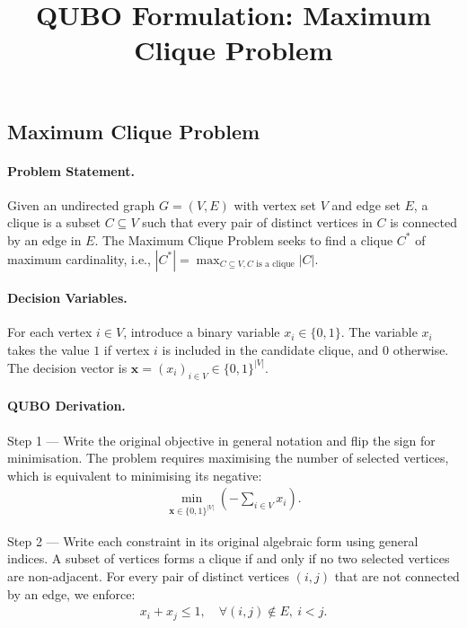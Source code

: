 \documentclass[12pt]{article}
\title{QUBO Formulation: Maximum Clique Problem}
\date{}
\begin{document}
\maketitle

\subsection*{Maximum Clique Problem}

\paragraph{Problem Statement.}
Given an undirected graph $G = (V, E)$ with vertex set $V$ and edge set $E$, a clique is a subset $C \subseteq V$ such that every pair of distinct vertices in $C$ is connected by an edge in $E$. The Maximum Clique Problem seeks to find a clique $C^*$ of maximum cardinality, i.e., $|C^*| = \max_{C \subseteq V, C \text{ is a clique}} |C|$.

\paragraph{Decision Variables.}
For each vertex $i \in V$, introduce a binary variable $x_i \in \{0, 1\}$. The variable $x_i$ takes the value $1$ if vertex $i$ is included in the candidate clique, and $0$ otherwise. The decision vector is $\mathbf{x} = (x_i)_{i \in V} \in \{0, 1\}^{|V|}$.

\paragraph{QUBO Derivation.}
Step 1 --- Write the original objective in general notation and flip the sign for minimisation. The problem requires maximising the number of selected vertices, which is equivalent to minimising its negative:
\begin{align}
  \min_{\mathbf{x} \in \{0, 1\}^{|V|}} \left( -\sum_{i \in V} x_i \right).
\end{align}

Step 2 --- Write each constraint in its original algebraic form using general indices. A subset of vertices forms a clique if and only if no two selected vertices are non-adjacent. For every pair of distinct vertices $(i, j)$ that are not connected by an edge, we enforce:
\begin{align}
  x_i + x_j \le 1, \quad \forall (i, j) \notin E, \ i < j.
\end{align}
\end{document}
